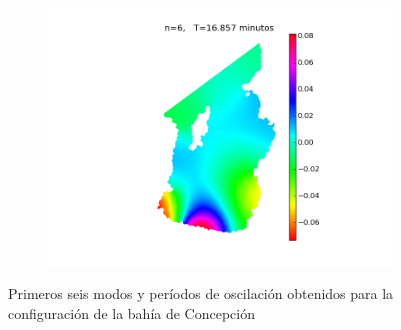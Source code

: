 \begin{figure}
\begin{subfigure}{0.5\textwidth}
  \end{subfigure}
  ~
  \begin{subfigure}{0.5\textwidth}
    \includegraphics[width=\textwidth]{figuras/modos6.png}
  \end{subfigure}
  
  \caption{Primeros seis modos y per\'iodos de oscilaci\'on obtenidos para la configuraci\'on de la bah\'ia de Concepci\'on}
  \label{fig:modos_talcahuano}
\end{figure}